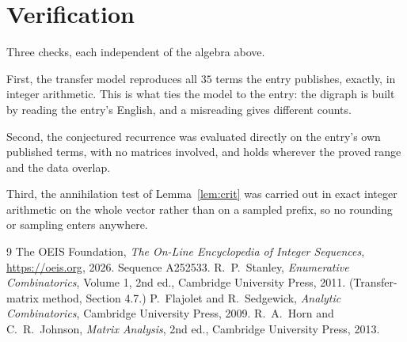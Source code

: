 \documentclass[11pt,a4paper]{article}
\theoremstyle{plain}
\theoremstyle{definition}
\begin{document}
\section{Verification}

Three checks, each independent of the algebra above.

First, the transfer model reproduces all $35$ terms the entry publishes, exactly, in
integer arithmetic. This is what ties the model to the entry: the digraph is built by reading
the entry's English, and a misreading gives different counts.

Second, the conjectured recurrence was evaluated directly on the entry's own published terms,
with no matrices involved, and holds wherever the proved range and the data overlap.

Third, the annihilation test of Lemma~\ref{lem:crit} was carried out in exact integer
arithmetic on the whole vector rather than on a sampled prefix, so no rounding or sampling
enters anywhere.

\begin{thebibliography}{9}
 The OEIS Foundation, \emph{The On-Line Encyclopedia of Integer
Sequences}, \url{https://oeis.org}, 2026. Sequence A252533.
 R.~P.~Stanley, \emph{Enumerative Combinatorics}, Volume 1, 2nd ed.,
Cambridge University Press, 2011. (Transfer-matrix method, Section 4.7.)
 P.~Flajolet and R.~Sedgewick, \emph{Analytic Combinatorics}, Cambridge
University Press, 2009.
 R.~A.~Horn and C.~R.~Johnson, \emph{Matrix Analysis}, 2nd ed., Cambridge
University Press, 2013.
\end{thebibliography}
\end{document}

